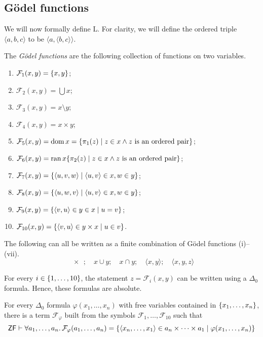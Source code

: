 \subsection{G\"odel functions}
We will now formally define \( \mathrm{L} \).
For clarity, we will define the ordered triple \( \langle a, b, c \rangle \) to be \( \langle a, \langle b, c \rangle \rangle \).
\begin{definition}
    The \emph{G\"odel functions} are the following collection of functions on two variables.
    \begin{enumerate}
        \item \( \mathcal F_1(x, y) = \qty{x, y} \);
        \item \( \mathcal F_2(x, y) = \bigcup x \);
        \item \( \mathcal F_3(x, y) = x \setminus y \);
        \item \( \mathcal F_4(x, y) = x \times y \);
        \item \( \mathcal F_5(x, y) = \operatorname{dom} x = \qty{\pi_1(z) \mid z \in x \wedge z \text{ is an ordered pair}} \);
        \item \( \mathcal F_6(x, y) = \operatorname{ran} x \qty{\pi_2(z) \mid z \in x \wedge z \text{ is an ordered pair}} \);
        \item \( \mathcal F_7(x, y) = \qty{\langle u, v, w \rangle \mid \langle u, v \rangle \in x, w \in y} \);
        \item \( \mathcal F_8(x, y) = \qty{\langle u, w, v \rangle \mid \langle u, v \rangle \in x, w \in y} \);
        \item \( \mathcal F_9(x, y) = \qty{\langle v, u \rangle \in y \in x \mid u = v} \);
        \item \( \mathcal F_{10}(x, y) = \qty{\langle v, u \rangle \in y \times x \mid u \in v} \).
    \end{enumerate}
\end{definition}
\begin{proposition}
    The following can all be written as a finite combination of G\"odel functions (i)--(vii).
    \[ \qty{x};\quad x \cup y;\quad x \cap y;\quad \langle x, y \rangle;\quad \langle x, y, z \rangle \]
\end{proposition}
\begin{proposition}
    For every \( i \in \qty{1, \dots, 10} \), the statement \( z = \mathcal F_i(x, y) \) can be written using a \( \Delta_0 \) formula.
    Hence, these formulas are absolute.
\end{proposition}
\begin{lemma}
    For every \( \Delta_0 \) formula \( \varphi(x_1, \dots, x_n) \) with free variables contained in \( \qty{x_1, \dots, x_n} \), there is a term \( \mathcal F_\varphi \) built from the symbols \( \mathcal F_1, \dots, \mathcal F_{10} \) such that
    \[ \mathsf{ZF} \vdash \forall a_1, \dots, a_n.\, \mathcal F_\varphi(a_1, \dots, a_n) = \qty{\langle x_n, \dots, x_1 \rangle \in a_n \times \dots \times a_1 \mid \varphi(x_1, \dots, x_n)} \]
\end{lemma}
